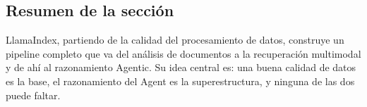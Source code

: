 \subsection{Resumen de la sección}

LlamaIndex, partiendo de la calidad del procesamiento de datos, construye un pipeline completo que va del análisis de documentos a la recuperación multimodal y de ahí al razonamiento Agentic. Su idea central es: una buena calidad de datos es la base, el razonamiento del Agent es la superestructura, y ninguna de las dos puede faltar.

